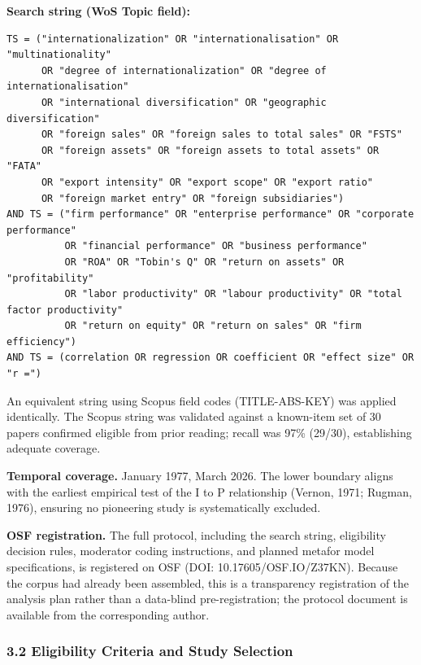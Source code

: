 \documentclass[
  12pt,a4paper]{article}
\begin{document}
\textbf{Search string (WoS Topic field):}

\begin{verbatim}
TS = ("internationalization" OR "internationalisation" OR "multinationality"
      OR "degree of internationalization" OR "degree of internationalisation"
      OR "international diversification" OR "geographic diversification"
      OR "foreign sales" OR "foreign sales to total sales" OR "FSTS"
      OR "foreign assets" OR "foreign assets to total assets" OR "FATA"
      OR "export intensity" OR "export scope" OR "export ratio"
      OR "foreign market entry" OR "foreign subsidiaries")
AND TS = ("firm performance" OR "enterprise performance" OR "corporate performance"
          OR "financial performance" OR "business performance"
          OR "ROA" OR "Tobin's Q" OR "return on assets" OR "profitability"
          OR "labor productivity" OR "labour productivity" OR "total factor productivity"
          OR "return on equity" OR "return on sales" OR "firm efficiency")
AND TS = (correlation OR regression OR coefficient OR "effect size" OR "r =")
\end{verbatim}

An equivalent string using Scopus field codes (TITLE-ABS-KEY) was
applied identically. The Scopus string was validated against a
known-item set of 30 papers confirmed eligible from prior reading;
recall was 97\% (29/30), establishing adequate coverage.

\textbf{Temporal coverage.} January 1977, March 2026. The lower boundary
aligns with the earliest empirical test of the I to P relationship
(Vernon, 1971; Rugman, 1976), ensuring no pioneering study is
systematically excluded.

\textbf{OSF registration.} The full protocol, including the search
string, eligibility decision rules, moderator coding instructions, and
planned metafor model specifications, is registered on OSF (DOI:
10.17605/OSF.IO/Z37KN). Because the corpus had already been assembled,
this is a transparency registration of the analysis plan rather than a
data-blind pre-registration; the protocol document is available from the
corresponding author.

\hypertarget{eligibility-criteria-and-study-selection}{%
\subsubsection{3.2 Eligibility Criteria and Study
Selection}\label{eligibility-criteria-and-study-selection}}
\end{document}
